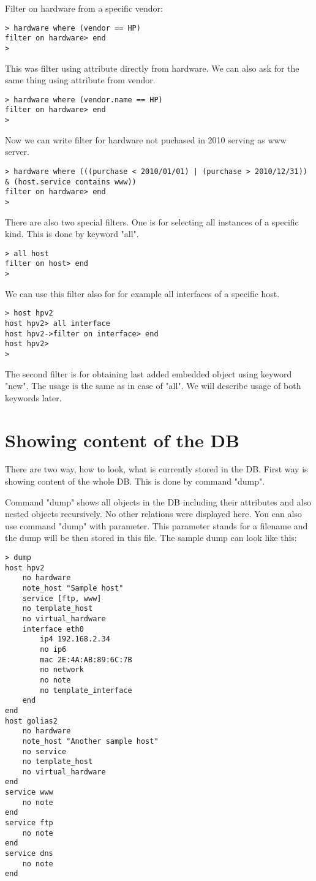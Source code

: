 \documentclass[deska]{subfiles}
\begin{document}
Filter on hardware from a specific vendor:
\begin{verbatim}
> hardware where (vendor == HP)
filter on hardware> end
>
\end{verbatim}

This was filter using attribute directly from hardware. We can also ask for the same thing using attribute from vendor.
\begin{verbatim}
> hardware where (vendor.name == HP)
filter on hardware> end
>
\end{verbatim}

Now we can write filter for hardware not puchased in 2010 serving as www server.

\begin{verbatim}
> hardware where (((purchase < 2010/01/01) | (purchase > 2010/12/31)) & (host.service contains www))
filter on hardware> end
>
\end{verbatim}

There are also two special filters. One is for selecting all instances of a specific kind. This is done by keyword "all".
\begin{verbatim}
> all host
filter on host> end
>
\end{verbatim}

We can use this filter also for for example all interfaces of a specific host.
\begin{verbatim}
> host hpv2
host hpv2> all interface
host hpv2->filter on interface> end
host hpv2>
>
\end{verbatim}

The second filter is for obtaining last added embedded object using keyword "new". The usage is the same as in case of
"all". We will describe usage of both keywords later.

\section{Showing content of the DB}

There are two way, how to look, what is currently stored in the DB. First way is showing content of the whole DB. This
is done by command "dump".

Command "dump" shows all objects in the DB including their attributes and also nested objects recursively. No other
relations were displayed here. You can also use command "dump" with parameter. This parameter stands for a filename and
the dump will be then stored in this file. The sample dump can look like this:
\begin{verbatim}
> dump
host hpv2
    no hardware
    note_host "Sample host"
    service [ftp, www]
    no template_host
    no virtual_hardware
    interface eth0
        ip4 192.168.2.34
        no ip6
        mac 2E:4A:AB:89:6C:7B
        no network
        no note
        no template_interface
    end
end
host golias2
    no hardware
    note_host "Another sample host"
    no service
    no template_host
    no virtual_hardware
end
service www
    no note
end
service ftp
    no note
end
service dns
    no note
end
\end{verbatim}
\end{document}
